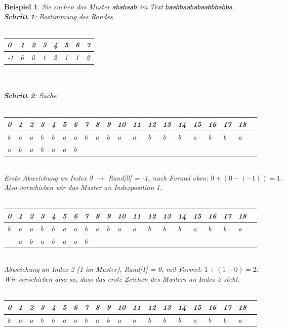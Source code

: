 \documentclass[11pt,a4paper]{scrartcl}
\newtheorem{example}{Beispiel}
\begin{document}
\begin{example}
Sie suchen das Muster \texttt{ababaab} im Text \texttt{baabbaababaabbbabba}. \\
\textbf{Schritt 1}: Bestimmung des Randes \\\\
\begin{tabular}{|l|l|l|l|l|l|l|l|}
\hline
 0 & 1 & 2 & 3 & 4 & 5 & 6 & 7 \\
\hline
-1 & 0 & 0 & 1 & 2 & 1 & 1 & 2 \\
\hline
\end{tabular} \\\\
\textbf{Schritt 2}: Suche \\\\
\begin{tabular}{|l|l|l|l|l|l|l|l|l|l|l|l|l|l|l|l|l|l|l|l|}
\hline
0 & 1 & 2&3&4&5&6&7&8&9&10&11&12&13&14&15&16&17&18 \\
\hline
\cellcolor{red}b&a&a&b&b&a&a&b&a&b&a&a&b&b&b&a&b&b&a \\
\hline
\cellcolor{red}a&b&a&b&a&a&b& & & & & & & & & & & & \\
\hline
\end{tabular} \\
Erste Abweichung an Index 0 $\to$ Rand[0] = -1, nach Formel oben: $0+(0-(-1)) = 1$. \\Also verschieben wir das Muster an Indexposition 1. \\\\
\begin{tabular}{|l|l|l|l|l|l|l|l|l|l|l|l|l|l|l|l|l|l|l|l|}
\hline
0&1&2&3&4&5&6&7&8&9&10&11&12&13&14&15&16&17&18 \\
\hline
b&\cellcolor{green}a&\cellcolor{red}a&b&b&a&a&b&a&b&a&a&b&b&b&a&b&b&a \\
\hline
 &\cellcolor{green}a&\cellcolor{red}b&a&b&a&a&b& & & & & & & & & & &  \\
\hline
\end{tabular} \\
Abweichung an Index 2 (1 im Muster), Rand[1] = 0, mit Formel: $1+(1-0) = 2$. \\Wir verschieben also so, dass das erste Zeichen des Musters an Index 2 steht.  \\\\
\begin{tabular}{|l|l|l|l|l|l|l|l|l|l|l|l|l|l|l|l|l|l|l|l|}
\hline
0&1&2&3&4&5&6&7&8&9&10&11&12&13&14&15&16&17&18 \\
\hline
b&a&\cellcolor{green}a&\cellcolor{green}b&\cellcolor{red}b&a&a&b&a&b&a&a&b&b&b&a&b&b&a \\

\end{tabular}
\end{example}
\end{document}
